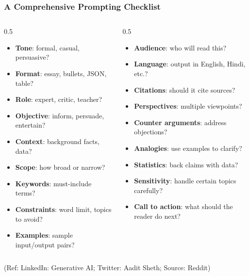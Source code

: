 \begin{frame}[fragile]\frametitle{A Comprehensive Prompting Checklist}

\begin{columns}
    \begin{column}[T]{0.5\linewidth}
    \begin{itemize}
    \item \textbf{Tone}: formal, casual, persuasive?
    \item \textbf{Format}: essay, bullets, JSON, table?
    \item \textbf{Role}: expert, critic, teacher?
    \item \textbf{Objective}: inform, persuade, entertain?
    \item \textbf{Context}: background facts, data?
    \item \textbf{Scope}: how broad or narrow?
    \item \textbf{Keywords}: must-include terms?
    \item \textbf{Constraints}: word limit, topics to avoid?
    \item \textbf{Examples}: sample input/output pairs?
    \end{itemize}
    \end{column}
    \begin{column}[T]{0.5\linewidth}
    \begin{itemize}
    \item \textbf{Audience}: who will read this?
    \item \textbf{Language}: output in English, Hindi, etc.?
    \item \textbf{Citations}: should it cite sources?
    \item \textbf{Perspectives}: multiple viewpoints?
    \item \textbf{Counter arguments}: address objections?
    \item \textbf{Analogies}: use examples to clarify?
    \item \textbf{Statistics}: back claims with data?
    \item \textbf{Sensitivity}: handle certain topics carefully?
    \item \textbf{Call to action}: what should the reader do next?
    \end{itemize}
    \end{column}
\end{columns}

\medskip
{\tiny (Ref: LinkedIn: Generative AI; Twitter: Aadit Sheth; Source: Reddit)}

\end{frame}


